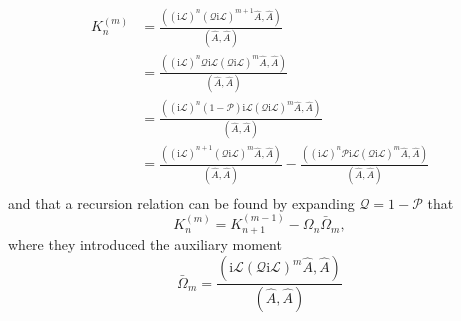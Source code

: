 \begin{align}
K_n^{(m)} &= \frac{\left((\mathrm{i} \mathcal{L})^n(\mathcal{Q} \mathrm{i} \mathcal{L})^{m+1} \hat{A}, \hat{A}\right)}{(\hat{A}, \hat{A})} \\
&= \frac{\left((\mathrm{i} \mathcal{L})^n \mathcal{Q} \mathrm{i} \mathcal{L} (\mathcal{Q} \mathrm{i} \mathcal{L})^{m}\hat{A}, \hat{A}\right)}{(\hat{A}, \hat{A})} \\
&= \frac{\left((\mathrm{i} \mathcal{L})^n \left(1-\mathcal{P}\right) \mathrm{i} \mathcal{L} (\mathcal{Q} \mathrm{i} \mathcal{L})^{m} \hat{A}, \hat{A}\right)}{(\hat{A}, \hat{A})} \\
&= \frac{\left((\mathrm{i} \mathcal{L})^{n+1} (\mathcal{Q} \mathrm{i} \mathcal{L})^{m} \hat{A}, \hat{A}\right)}{(\hat{A}, \hat{A})} - \frac{\left((\mathrm{i} \mathcal{L})^n \mathcal{P} \mathrm{i} \mathcal{L} (\mathcal{Q} \mathrm{i} \mathcal{L})^{m} \hat{A}, \hat{A}\right)}{(\hat{A}, \hat{A})} \\
\end{align}
and that a recursion relation can be found by expanding $\mathcal{Q}=1-\mathcal{P}$ that
\begin{equation}
K_n^{(m)}=K_{n+1}^{(m-1)}-\Omega_n \bar{\Omega}_m,
\end{equation}
where they introduced the auxiliary moment
\begin{equation}
\bar{\Omega}_m=\frac{\left(\mathrm{i} \mathcal{L}(\mathcal{Q} \mathrm{i} \mathcal{L})^m \hat{A}, \hat{A}\right)}{(\hat{A}, \hat{A})}
\end{equation}
